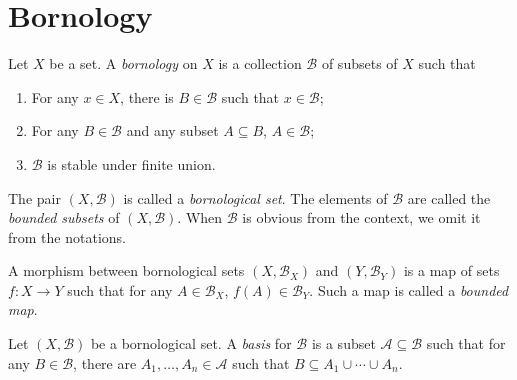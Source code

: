 \section{Bornology}
\begin{definition}
    Let $X$ be a set. A \emph{bornology} on $X$ is a collection $\mathcal{B}$ of subsets of $X$ such that
    \begin{enumerate}
        \item For any $x\in X$, there is $B\in \mathcal{B}$ such that $x\in \mathcal{B}$;
        \item For any $B\in \mathcal{B}$ and any subset $A\subseteq B$, $A\in \mathcal{B}$;
        \item $\mathcal{B}$ is stable under finite union.
    \end{enumerate}

    The pair $(X,\mathcal{B})$ is called a \emph{bornological set}. The elements of $\mathcal{B}$ are called the \emph{bounded subsets} of $(X,\mathcal{B})$. When $\mathcal{B}$ is obvious from the context, we omit it from the notations.
    
    A morphism between bornological sets $(X,\mathcal{B}_X)$ and $(Y,\mathcal{B}_Y)$ is a map of sets $f:X\rightarrow Y$ such that for any $A\in \mathcal{B}_X$, $f(A)\in \mathcal{B}_Y$. Such a map is called a \emph{bounded map}.
\end{definition}
\begin{definition}
    Let $(X,\mathcal{B})$ be a bornological set. A \emph{basis} for $\mathcal{B}$ is a subset $\mathcal{A}\subseteq \mathcal{B}$ such that for any $B\in \mathcal{B}$, there are $A_1,\ldots,A_n\in \mathcal{A}$ such that $B\subseteq A_1\cup\cdots\cup A_n$.
\end{definition}


\printbibliography
